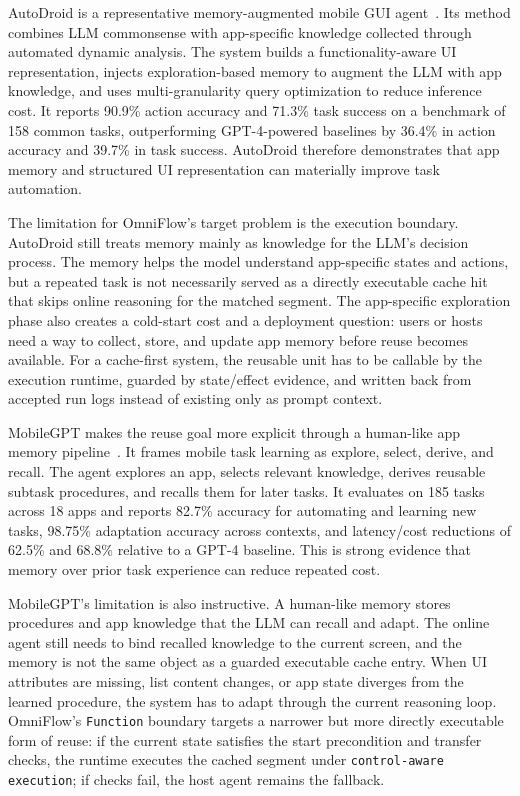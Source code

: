 \documentclass[sigplan,10pt]{acmart}
\newcommand{\sysname}{OmniFlow\xspace}
\begin{document}
AutoDroid is a representative memory-augmented mobile GUI
agent~\cite{wen2024autodroid}. Its method combines LLM commonsense with
app-specific knowledge collected through automated dynamic analysis. The system
builds a functionality-aware UI representation, injects exploration-based
memory to augment the LLM with app knowledge, and uses multi-granularity query
optimization to reduce inference cost. It reports 90.9\% action accuracy and
71.3\% task success on a benchmark of 158 common tasks, outperforming
GPT-4-powered baselines by 36.4\% in action accuracy and 39.7\% in task
success. AutoDroid therefore demonstrates that app memory and structured UI
representation can materially improve task automation.

The limitation for \sysname's target problem is the execution boundary.
AutoDroid still treats memory mainly as knowledge for the LLM's decision
process. The memory helps the model understand app-specific states and actions,
but a repeated task is not necessarily served as a directly executable cache hit
that skips online reasoning for the matched segment. The app-specific
exploration phase also creates a cold-start cost and a deployment question:
users or hosts need a way to collect, store, and update app memory before reuse
becomes available. For a cache-first system, the reusable unit has to be
callable by the execution runtime, guarded by state/effect evidence, and written
back from accepted run logs instead of existing only as prompt context.

MobileGPT makes the reuse goal more explicit through a human-like app memory
pipeline~\cite{lee2024mobilegpt}. It frames mobile task learning as explore,
select, derive, and recall. The agent explores an app, selects relevant
knowledge, derives reusable subtask procedures, and recalls them for later
tasks. It evaluates on 185 tasks across 18 apps and reports 82.7\% accuracy for
automating and learning new tasks, 98.75\% adaptation accuracy across contexts,
and latency/cost reductions of 62.5\% and 68.8\% relative to a GPT-4 baseline.
This is strong evidence that memory over prior task experience can reduce
repeated cost.

MobileGPT's limitation is also instructive. A human-like memory stores
procedures and app knowledge that the LLM can recall and adapt. The online agent
still needs to bind recalled knowledge to the current screen, and the memory is
not the same object as a guarded executable cache entry. When UI attributes are
missing, list content changes, or app state diverges from the learned procedure,
the system has to adapt through the current reasoning loop. \sysname's
\texttt{Function} boundary targets a narrower but more directly executable form
of reuse: if the current state satisfies the start precondition and transfer
checks, the runtime executes the cached segment under
\texttt{control-aware execution}; if checks fail, the host agent remains the
fallback.
\end{document}
